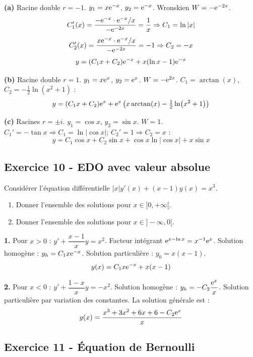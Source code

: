 \documentclass[12pt,a4paper]{article}
\begin{document}
\begin{boitecorrige}
\textbf{(a)} Racine double $r=-1$. $y_1 = x\mathrm{e}^{-x}$, $y_2 = \mathrm{e}^{-x}$. Wronskien $W = -\mathrm{e}^{-2x}$.
\[
C_1'(x) = \frac{-\mathrm{e}^{-x}\cdot\mathrm{e}^{-x}/x}{-\mathrm{e}^{-2x}} = \frac{1}{x} \Rightarrow C_1 = \ln|x|
\]
\[
C_2'(x) = \frac{x\mathrm{e}^{-x}\cdot\mathrm{e}^{-x}/x}{-\mathrm{e}^{-2x}} = -1 \Rightarrow C_2 = -x
\]
\[
y = (C_1 x + C_2)\mathrm{e}^{-x} + x(\ln x - 1)\mathrm{e}^{-x}
\]

\textbf{(b)} Racine double $r=1$. $y_1 = x\mathrm{e}^x$, $y_2 = \mathrm{e}^x$. $W = -\mathrm{e}^{2x}$.
$C_1 = \arctan(x)$, $C_2 = -\frac{1}{2}\ln(x^2+1)$ :
\[
y = (C_1 x + C_2)\mathrm{e}^x + \mathrm{e}^x\left(x\arctan(x) - \tfrac{1}{2}\ln(x^2+1)\right)
\]

\textbf{(c)} Racines $r = \pm i$. $y_1 = \cos x$, $y_2 = \sin x$. $W = 1$.
$C_1' = -\tan x \Rightarrow C_1 = \ln|\cos x|$; $C_2' = 1 \Rightarrow C_2 = x$ :
\[
\boxed{y = C_1\cos x + C_2\sin x + \cos x\ln|\cos x| + x\sin x}
\]
\end{boitecorrige}

\subsection*{Exercice 10 - EDO avec valeur absolue \niveau{\difficile}}

\begin{boiteexercice}
Considérer l'équation différentielle $|x|y'(x) + (x-1)y(x) = x^3$.
\begin{enumerate}
  \item Donner l'ensemble des solutions pour $x \in ]0,+\infty[$.
  \item Donner l'ensemble des solutions pour $x \in ]-\infty, 0[$.
\end{enumerate}
\end{boiteexercice}

\begin{boitecorrige}
\textbf{1.} Pour $x > 0$ : $y' + \dfrac{x-1}{x}y = x^2$. Facteur intégrant $\mathrm{e}^{x-\ln x} = x^{-1}\mathrm{e}^x$. Solution homogène : $y_h = C_1 x\mathrm{e}^{-x}$. Solution particulière : $y_0 = x(x-1)$.
\[
y(x) = C_1 x\mathrm{e}^{-x} + x(x-1)
\]

\textbf{2.} Pour $x < 0$ : $y' + \dfrac{1-x}{x}y = -x^2$. Solution homogène : $y_h = -C_2\dfrac{\mathrm{e}^x}{x}$.
Solution particulière par variation des constantes. La solution générale est :
\[
y(x) = \frac{x^3 + 3x^2 + 6x + 6 - C_2\mathrm{e}^x}{x}
\]
\end{boitecorrige}

\subsection*{Exercice 11 - Équation de Bernoulli \niveau{\difficile}}
\end{document}
